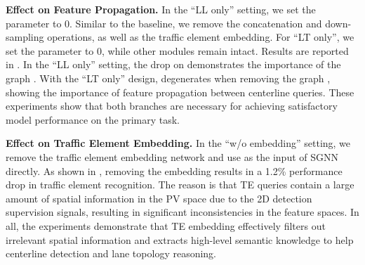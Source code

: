 \smallskip
\noindent
\textbf{Effect on Feature Propagation.}
In the ``LL only'' setting, we set the  parameter to 0. Similar to the baseline, we remove the concatenation and down-sampling operations, as well as the traffic element embedding.
For ``LT only'', we set the  parameter to 0, while other modules remain intact. 
Results are reported in .
In the ``LL only'' setting, the drop on  demonstrates the importance of the graph .
With the ``LT only'' design,  degenerates when removing the graph , showing the importance of feature propagation between centerline queries.
These experiments show that both branches are necessary for achieving satisfactory model performance on the primary task.


\begin{table}[t!]
    \centering
\caption{\textbf{Ablation on edge weight} in the scene knowledge graph.}
    \label{tab:ab:weight}
    \vspace{-5px}
\end{table} 

\smallskip
\noindent
\textbf{Effect on Traffic Element Embedding.}
In the ``w/o embedding'' setting, we remove the traffic element embedding network and use  as the input of SGNN directly.
As shown in , removing the embedding results in a 1.2\% performance drop in traffic element recognition.
The reason is that TE queries contain a large amount of spatial information in the PV space due to the 2D detection supervision signals, resulting in significant inconsistencies in the feature spaces.
In all, the experiments demonstrate that TE embedding effectively filters out irrelevant spatial information and extracts high-level semantic knowledge to help centerline detection and lane topology reasoning.




